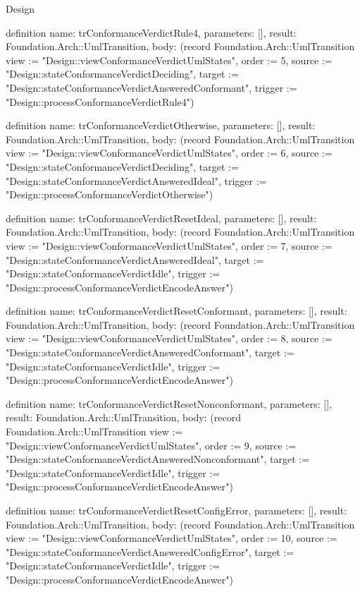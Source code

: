 \begin{lexlean}{Design}
\begin{semanticmodule}
definition{
  name: trConformanceVerdictRule4,
  parameters: [],
  result: Foundation.Arch::UmlTransition,
  body: (record Foundation.Arch::UmlTransition {view := "Design::viewConformanceVerdictUmlStates", order := 5, source := "Design::stateConformanceVerdictDeciding", target := "Design::stateConformanceVerdictAnsweredConformant", trigger := "Design::processConformanceVerdictRule4"})
}

definition{
  name: trConformanceVerdictOtherwise,
  parameters: [],
  result: Foundation.Arch::UmlTransition,
  body: (record Foundation.Arch::UmlTransition {view := "Design::viewConformanceVerdictUmlStates", order := 6, source := "Design::stateConformanceVerdictDeciding", target := "Design::stateConformanceVerdictAnsweredIdeal", trigger := "Design::processConformanceVerdictOtherwise"})
}

definition{
  name: trConformanceVerdictResetIdeal,
  parameters: [],
  result: Foundation.Arch::UmlTransition,
  body: (record Foundation.Arch::UmlTransition {view := "Design::viewConformanceVerdictUmlStates", order := 7, source := "Design::stateConformanceVerdictAnsweredIdeal", target := "Design::stateConformanceVerdictIdle", trigger := "Design::processConformanceVerdictEncodeAnswer"})
}

definition{
  name: trConformanceVerdictResetConformant,
  parameters: [],
  result: Foundation.Arch::UmlTransition,
  body: (record Foundation.Arch::UmlTransition {view := "Design::viewConformanceVerdictUmlStates", order := 8, source := "Design::stateConformanceVerdictAnsweredConformant", target := "Design::stateConformanceVerdictIdle", trigger := "Design::processConformanceVerdictEncodeAnswer"})
}

definition{
  name: trConformanceVerdictResetNonconformant,
  parameters: [],
  result: Foundation.Arch::UmlTransition,
  body: (record Foundation.Arch::UmlTransition {view := "Design::viewConformanceVerdictUmlStates", order := 9, source := "Design::stateConformanceVerdictAnsweredNonconformant", target := "Design::stateConformanceVerdictIdle", trigger := "Design::processConformanceVerdictEncodeAnswer"})
}

definition{
  name: trConformanceVerdictResetConfigError,
  parameters: [],
  result: Foundation.Arch::UmlTransition,
  body: (record Foundation.Arch::UmlTransition {view := "Design::viewConformanceVerdictUmlStates", order := 10, source := "Design::stateConformanceVerdictAnsweredConfigError", target := "Design::stateConformanceVerdictIdle", trigger := "Design::processConformanceVerdictEncodeAnswer"})
}


\end{semanticmodule}
\end{lexlean}
